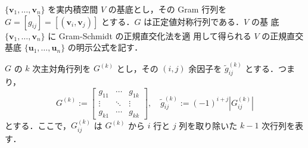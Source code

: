 \documentclass[11pt, uplatex, dvipdfmx]{jsarticle}
\theoremstyle{definition}
\begin{document}
$\{\bm{v}_1, \ldots, \bm{v}_n\}$ を実内積空間 $V$ の基底とし，その Gram
行列を
$G = \left[ g_{ij} \right]= \left[ \left(\bm{v}_i, \bm{v}_j
  \right)\right]$ とする．$G$ は正定値対称行列である．$V$ の基
底 $\{\bm{v}_1, \ldots, \bm{v}_n\}$ に Gram-Schmidt の正規直交化法を適
用して得られる $V$ の正規直交基底 $\{\bm{u}_1, \ldots, \bm{u}_n\}$ の明示公式を記す．

$G$ の $k$ 次主対角行列を $G^{(k)}$ とし，その $(i,j)$ 余因子を $\tilde{g}^{(k)}_{ij}$ とする．つまり，
\[
  G^{(k)} := \left[
    \begin{array}{ccc}
      g_{11} & \cdots & g_{1k}\\
      \vdots & \ddots & \vdots\\
      g_{k1} & \cdots & g_{kk}
    \end{array}
  \right], \quad \tilde{g}^{(k)}_{ij} := (-1)^{i+j} \left|G^{(k)}_{ij}\right|
\]
とする．ここで，$G^{(k)}_{ij}$ は $G^{(k)}$ から $i$ 行と $j$ 列を取り除いた $k-1$ 次行列を表す．
\end{document}
